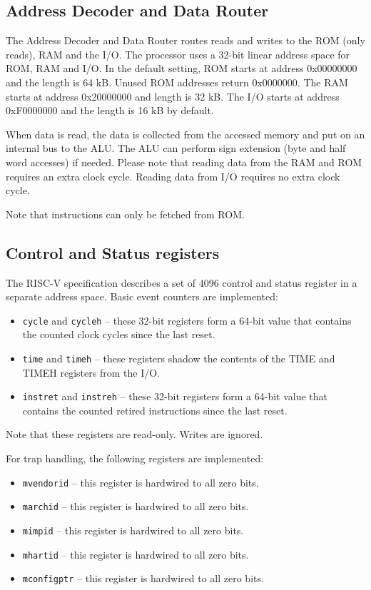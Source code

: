 \documentclass[12pt]{article}
\begin{document}
\subsection{Address Decoder and Data Router}
\label{sec:addressdecoderanddatarouter}
The Address Decoder and Data Router routes reads and writes to the ROM (only reads), RAM and the I/O. The processor uses a 32-bit linear address space for ROM, RAM and I/O. In the default setting, ROM starts at address 0x00000000 and the length is 64 kB. Unused ROM addresses return 0x0000000. The RAM starts at address 0x20000000 and length is 32 kB. The I/O starts at address 0xF0000000 and the length is 16 kB by default.

When data is read, the data is collected from the accessed memory and put on an internal bus to the ALU. The ALU can perform sign extension (byte and half word accesses) if needed. Please note that reading data from the RAM and ROM requires an extra clock cycle. Reading data from I/O requires no extra clock cycle.

Note that instructions can only be fetched from ROM.

\subsection{Control and Status registers}
The RISC-V specification describes a set of 4096 control and status register in a separate address space. Basic event counters are implemented:

\begin{itemize}
\item \texttt{cycle} and \texttt{cycleh} -- these 32-bit registers form a 64-bit value that contains the counted clock cycles since the last reset.
\item \texttt{time} and \texttt{timeh} -- these registers shadow the contents of the TIME and TIMEH registers from the I/O.
\item \texttt{instret} and \texttt{instreh} -- these 32-bit registers form a 64-bit value that contains the counted retired instructions since the last reset.
\end{itemize}

Note that these registers are read-only. Writes are ignored. 

For trap handling, the following registers are implemented:

\begin{itemize}
\item \texttt{mvendorid} -- this register is hardwired to all zero bits.
\item \texttt{marchid} -- this register is hardwired to all zero bits.
\item \texttt{mimpid} -- this register is hardwired to all zero bits.
\item \texttt{mhartid} -- this register is hardwired to all zero bits.
\item \texttt{mconfigptr} -- this register is hardwired to all zero bits.
\end{itemize}
\end{document}
